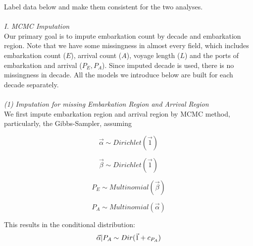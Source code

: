 \documentclass{article}
\begin{document}
Label data below and make them consistent for the two analyses.\\
\\
\textit{I. MCMC Imputation}\\
\indent
Our primary goal is to impute embarkation count by decade and embarkation region. Note that we have some missingness in almost every field, which includes embarkation count ($E$), arrival count ($A$), voyage length ($L$) and the ports of embarkation and arrival ($P_E, P_A$). Since imputed decade is used, there is no missingness in decade. All the models we introduce below are built for each decade separately.\\
\\
\textit{(1) Imputation for missing Embarkation Region and Arrival Region}\\
\indent
We first impute embarkation region and arrival region by MCMC method, particularly, the Gibbs-Sampler, assuming

\begin{equation}
\vec{\alpha}  \sim Dirichlet(\vec{1})
\end{equation}

\begin{equation}
\vec{\beta}  \sim Dirichlet(\vec{1})
\end{equation}

\begin{equation}
P_E  \sim Multinomial(\vec{\beta})
\end{equation}

\begin{equation}
P_A  \sim Multinomial(\vec{\alpha})
\end{equation}

This results in the conditional distribution:
\begin{equation}
\vec{\alpha}|P_A \sim Dir(\vec{1}+c_{P_A})\\
\end{equation}
\end{document}
